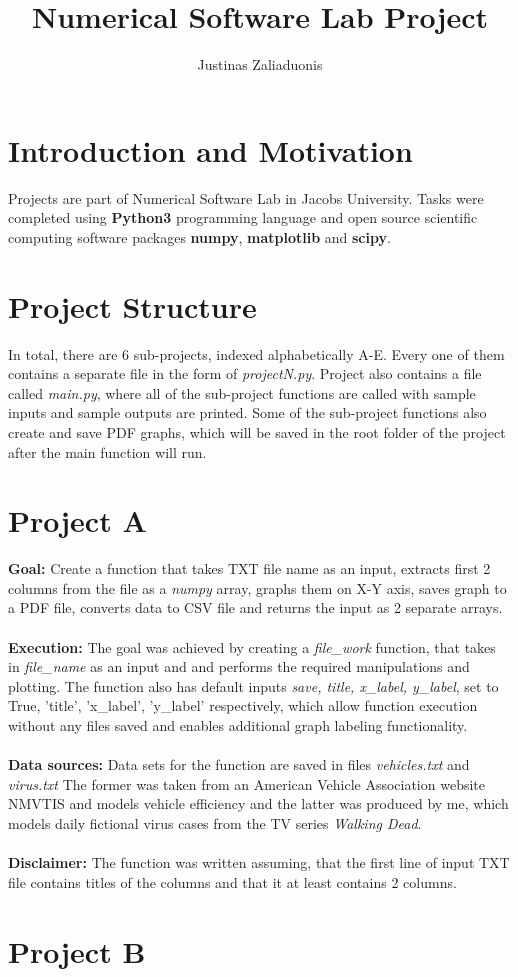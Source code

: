 \documentclass[a4paper,12pt]{article}
\begin{document}
\title{Numerical Software Lab Project}
\author{Justinas Zaliaduonis}
\maketitle


\section{Introduction and Motivation}

Projects are part of Numerical Software Lab in Jacobs University. Tasks were completed using \textbf{Python3} programming language and open source scientific computing software packages \textbf{numpy}, \textbf{matplotlib} and \textbf{scipy}.

\section{Project Structure} 

In total, there are 6 sub-projects, indexed alphabetically A-E. Every one of them contains a separate file in the form of \textit{projectN.py}. Project also contains a file called \textit{main.py}, where all of the sub-project functions are called with sample inputs and sample outputs are printed. Some of the sub-project functions also create and save PDF graphs, which will be saved in the root folder of the project after the main function will run.

\section{Project A}
\textbf{Goal:} Create a function that takes TXT file name as an input, extracts first 2 columns from the file as a \textit{numpy} array, graphs them on X-Y axis, saves graph to a PDF file, converts data to CSV file and returns the input as 2 separate arrays. \\ \\ \textbf{Execution: } The goal was achieved by creating a \textit{file\_work} function, that takes in \textit{file\_name} as an input and and performs the required manipulations and plotting. The function also has default inputs \textit{save, title, x\_label, y\_label}, set to True, 'title', 'x\_label', 'y\_label' respectively, which allow function execution without any files saved and enables additional graph labeling functionality. \\ \\ \textbf{Data sources:} Data sets for the function are saved in files \textit{vehicles.txt} and \textit{virus.txt} The former was taken from an American Vehicle Association website NMVTIS and models vehicle efficiency and the latter was produced by me, which models daily fictional virus cases from the TV series \textit{Walking Dead}. \\ \\ \textbf{Disclaimer:} The function was written assuming, that the first line of input TXT file contains titles of the columns and
that it at least contains 2 columns.


\section{Project B}
\end{document}
